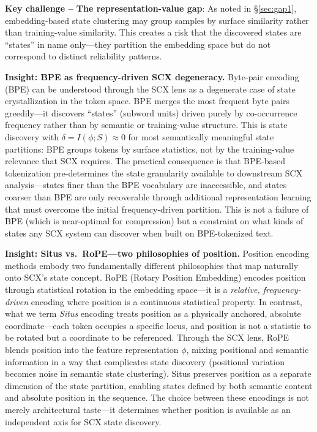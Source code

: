 \documentclass[11pt,twocolumn]{article}
\begin{document}
\textbf{Key challenge -- The representation-value gap}: As noted in \S\ref{sec:gap1}, embedding-based state clustering may group samples by surface similarity rather than training-value similarity. This creates a risk that the discovered states are ``states'' in name only---they partition the embedding space but do not correspond to distinct reliability patterns.

\textbf{Insight: BPE as frequency-driven SCX degeneracy.} Byte-pair encoding (BPE) can be understood through the SCX lens as a degenerate case of state crystallization in the token space. BPE merges the most frequent byte pairs greedily---it discovers ``states'' (subword units) driven purely by co-occurrence frequency rather than by semantic or training-value structure. This is state discovery with $\delta = I(\phi; S) \approx 0$ for most semantically meaningful state partitions: BPE groups tokens by surface statistics, not by the training-value relevance that SCX requires. The practical consequence is that BPE-based tokenization pre-determines the state granularity available to downstream SCX analysis---states finer than the BPE vocabulary are inaccessible, and states coarser than BPE are only recoverable through additional representation learning that must overcome the initial frequency-driven partition. This is not a failure of BPE (which is near-optimal for compression) but a constraint on what kinds of states any SCX system can discover when built on BPE-tokenized text.

\textbf{Insight: Situs vs.\ RoPE---two philosophies of position.} Position encoding methods embody two fundamentally different philosophies that map naturally onto SCX's state concept. RoPE (Rotary Position Embedding) encodes position through statistical rotation in the embedding space---it is a \textit{relative, frequency-driven} encoding where position is a continuous statistical property. In contrast, what we term \textit{Situs} encoding treats position as a physically anchored, absolute coordinate---each token occupies a specific locus, and position is not a statistic to be rotated but a coordinate to be referenced. Through the SCX lens, RoPE blends position into the feature representation $\phi$, mixing positional and semantic information in a way that complicates state discovery (positional variation becomes noise in semantic state clustering). Situs preserves position as a separate dimension of the state partition, enabling states defined by both semantic content and absolute position in the sequence. The choice between these encodings is not merely architectural taste---it determines whether position is available as an independent axis for SCX state discovery.
\end{document}
